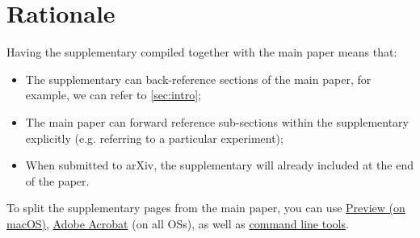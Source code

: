 \clearpage
\setcounter{page}{1}
\maketitlesupplementary


\section{Rationale}
\label{sec:rationale}
%
Having the supplementary compiled together with the main paper means that:
%
\begin{itemize}
	\item The supplementary can back-reference sections of the main paper, for example, we can refer to \cref{sec:intro};
	\item The main paper can forward reference sub-sections within the supplementary explicitly (e.g. referring to a particular experiment);
	\item When submitted to arXiv, the supplementary will already included at the end of the paper.
\end{itemize}
%
To split the supplementary pages from the main paper, you can use \href{https://support.apple.com/en-ca/guide/preview/prvw11793/mac#:~:text=Delete%20a%20page%20from%20a,or%20choose%20Edit%20%3E%20Delete).}{Preview (on macOS)}, \href{https://www.adobe.com/acrobat/how-to/delete-pages-from-pdf.html#:~:text=Choose%20%E2%80%9CTools%E2%80%9D%20%3E%20%E2%80%9COrganize,or%20pages%20from%20the%20file.}{Adobe Acrobat} (on all OSs), as well as \href{https://superuser.com/questions/517986/is-it-possible-to-delete-some-pages-of-a-pdf-document}{command line tools}.

